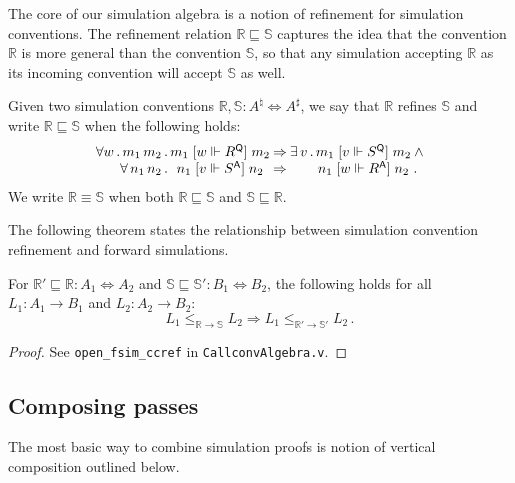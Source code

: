 \documentclass[sigplan,10pt,review,anonymous]{acmart}\settopmatter{printfolios=true,printccs=false,printacmref=false}
\newcommand{\kw}[1]{\ensuremath{ \mathsf{#1} }}
\newcommand{\ifr}[1]{\mathrel{[{#1}]}}
\begin{document}
The core of our simulation algebra is
a notion of refinement for simulation conventions.
The refinement relation $\mathbb{R} \sqsubseteq \mathbb{S}$
captures the idea that the convention $\mathbb{R}$
is more general than the convention $\mathbb{S}$,
so that any simulation accepting $\mathbb{R}$ as its
incoming convention will accept $\mathbb{S}$ as well.

\begin{definition} %
Given two simulation conventions
$\mathbb{R}, \mathbb{S} : A^\natural \Leftrightarrow A^\sharp$,
we say that
$\mathbb{R}$ refines $\mathbb{S}$ and write
$\mathbb{R} \sqsubseteq \mathbb{S}$
when the following holds:
\[
    \begin{array}{r@{}c@{\:\Rightarrow\:}c@{}c@{}l}
      \forall w \,.\, m_1 \, m_2 \,.\, &
      m_1 \ifr{w \Vdash R^\kw{Q}} m_2 &
      \exists \, v \,.\, &
      m_1 \ifr{v \Vdash S^\kw{Q}} m_2 &
      \: \wedge \\
      \forall \, n_1 \, n_2 \,.\, &
      n_1 \ifr{v \Vdash S^\kw{A}} n_2 &
      &
      n_1 \ifr{w \Vdash R^\kw{A}} n_2 & \,.
    \end{array}
\]
We write $\mathbb{R} \equiv \mathbb{S}$ when both
$\mathbb{R} \sqsubseteq \mathbb{S}$ and
$\mathbb{S} \sqsubseteq \mathbb{R}$.
\end{definition}

The following theorem states the relationship between
simulation convention refinement and forward simulations.

\begin{theorem} %
For
$\mathbb{R}' \sqsubseteq \mathbb{R} : A_1 \Leftrightarrow A_2$ and
$\mathbb{S} \sqsubseteq \mathbb{S}' : B_1 \Leftrightarrow B_2$,
the following holds for all
$L_1 : A_1 \rightarrow B_1$ and $L_2 : A_2 \rightarrow B_2$:
\[
      L_1 \le_{\mathbb{R} \rightarrow \mathbb{S}} L_2 \Rightarrow
      L_1 \le_{\mathbb{R}' \rightarrow \mathbb{S}'} L_2 \,.
\]
\begin{proof}
See \texttt{open\_fsim\_ccref} in \texttt{CallconvAlgebra.v}.
\end{proof}
\end{theorem}


\subsection{Composing passes} %

The most basic way to combine simulation proofs
is notion of vertical composition outlined below.
\end{document}
